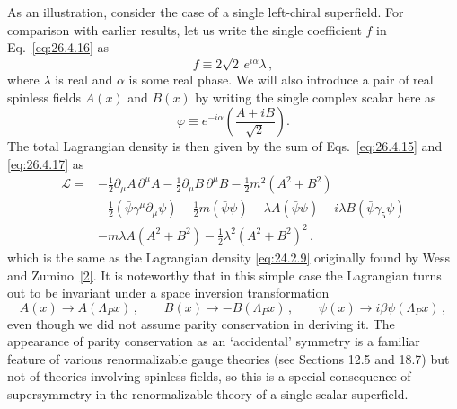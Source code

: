 As an illustration, consider the case of a single left-chiral superfield. For
comparison with earlier results, let us write the single coefficient \(f\) in
Eq.~\eqref{eq:26.4.16} as
\begin{equation}
  f\equiv2\sqrt2\,e^{i\alpha}\lambda\,,
  \tag{26.4.18}\label{eq:26.4.18}
\end{equation}
where \(\lambda\) is real and \(\alpha\) is some real phase. We will also
introduce a pair of real spinless fields \(A(x)\) and \(B(x)\) by writing the
single complex scalar here as
\begin{equation}
  \varphi\equiv e^{-i\alpha}\left(\frac{A+iB}{\sqrt2}\right).
  \tag{26.4.19}\label{eq:26.4.19}
\end{equation}
The total Lagrangian density is then given by the sum of
Eqs.~\eqref{eq:26.4.15} and \eqref{eq:26.4.17} as
\begin{equation}
  \begin{aligned}
  \mathcal{L}={}&
  -\frac12\partial_\mu A\,\partial^\mu A
  -\frac12\partial_\mu B\,\partial^\mu B
  -\frac12m^2(A^2+B^2)
  \\
  &-\frac12(\bar\psi\gamma^\mu\partial_\mu\psi)
  -\frac12m(\bar\psi\psi)
  -\lambda A(\bar\psi\psi)
  -i\lambda B(\bar\psi\gamma_5\psi)
  \\
  &-m\lambda A(A^2+B^2)
  -\frac12\lambda^2(A^2+B^2)^2\,.
  \end{aligned}
  \tag{26.4.20}\label{eq:26.4.20}
\end{equation}
which is the same as the Lagrangian density \eqref{eq:24.2.9} originally found
by Wess and Zumino~\hyperref[ch26-ref-2]{[2]}. It is noteworthy that in this
simple case the Lagrangian turns out to be invariant under a space inversion
transformation
\begin{equation}
  A(x)\longrightarrow A(\Lambda_Px)\,,
  \qquad
  B(x)\longrightarrow-B(\Lambda_Px)\,,
  \qquad
  \psi(x)\longrightarrow i\beta\psi(\Lambda_Px)\,,
  \tag{26.4.21}\label{eq:26.4.21}
\end{equation}
even though we did not assume parity conservation in deriving it. The
appearance of parity conservation as an `accidental' symmetry is a familiar
feature of various renormalizable gauge theories (see Sections 12.5 and 18.7)
but not of theories involving spinless fields, so this is a special
consequence of supersymmetry in the renormalizable theory of a single scalar
superfield.
